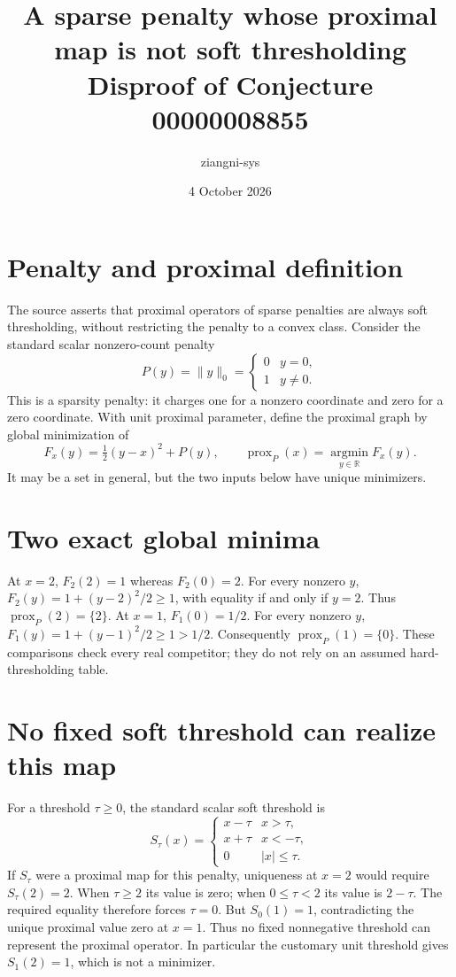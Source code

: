 \documentclass[10pt]{article}
\title{A sparse penalty whose proximal map is not soft thresholding\\Disproof of Conjecture 00000008855}
\author{ziangni-sys}
\date{4 October 2026}
\begin{document}
\maketitle
\section*{Penalty and proximal definition}
The source asserts that proximal operators of sparse penalties are
always soft thresholding, without restricting the penalty to a convex
class. Consider the standard scalar nonzero-count penalty
\[
P(y)=\|y\|_0=
\begin{cases}0&y=0,\\1&y\ne0.\end{cases}
\]
This is a sparsity penalty: it charges one for a nonzero coordinate and
zero for a zero coordinate.
With unit proximal parameter, define the proximal graph by global
minimization of
\[
F_x(y)=\tfrac12(y-x)^2+P(y),\qquad
\operatorname{prox}_{P}(x)=\operatorname*{argmin}_{y\in\mathbb R}F_x(y).
\]
It may be a set in general, but the two inputs below have unique minimizers.

\section*{Two exact global minima}
At $x=2$, $F_2(2)=1$ whereas $F_2(0)=2$.
For every nonzero $y$, $F_2(y)=1+(y-2)^2/2\geq1$,
with equality if and only if $y=2$. Thus
$\operatorname{prox}_{P}(2)=\{2\}$.
At $x=1$, $F_1(0)=1/2$. For every nonzero $y$,
$F_1(y)=1+(y-1)^2/2\geq1>1/2$.
Consequently $\operatorname{prox}_{P}(1)=\{0\}$.
These comparisons check every real competitor; they do not rely on
an assumed hard-thresholding table.

\section*{No fixed soft threshold can realize this map}
For a threshold $\tau\geq0$, the standard scalar soft threshold is
\[
S_\tau(x)=
\begin{cases}
x-\tau&x>\tau,\\
x+\tau&x<-\tau,\\
0&|x|\leq\tau.
\end{cases}
\]
If $S_\tau$ were a proximal map for this penalty, uniqueness at $x=2$
would require $S_\tau(2)=2$.
When $\tau\geq2$ its value is zero; when $0\leq\tau<2$ its value
is $2-\tau$. The required equality therefore forces $\tau=0$.
But $S_0(1)=1$, contradicting the unique proximal value zero at $x=1$.
Thus no fixed nonnegative threshold can represent the proximal operator.
In particular the customary unit threshold gives $S_1(2)=1$,
which is not a minimizer.
\end{document}
